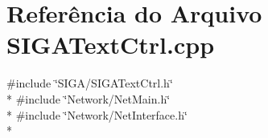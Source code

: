 \section{Referência do Arquivo S\+I\+G\+A\+Text\+Ctrl.\+cpp}
\label{_s_i_g_a_text_ctrl_8cpp}
{\ttfamily \#include \char`\"{}S\+I\+G\+A/\+S\+I\+G\+A\+Text\+Ctrl.\+h\char`\"{}}\\*
{\ttfamily \#include \char`\"{}Network/\+Net\+Main.\+h\char`\"{}}\\*
{\ttfamily \#include \char`\"{}Network/\+Net\+Interface.\+h\char`\"{}}\\*
